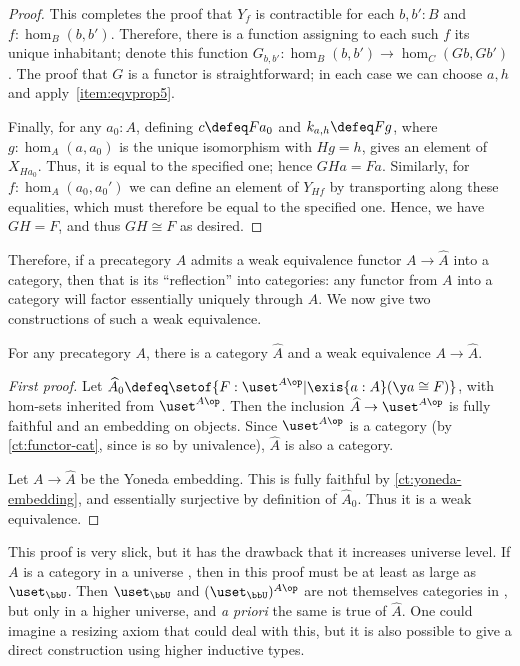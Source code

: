 \begin{proof}
  This completes the proof that $Y_f$ is contractible for each $b,b':B$ and $f:\hom_B(b,b')$.
  Therefore, there is a function assigning to each such $f$ its unique inhabitant; denote this function $G_{b,b'}:\hom_B(b,b') \to \hom_C(Gb,Gb')$.
  The proof that $G$ is a functor is straightforward; in each case we can choose $a,h$ and apply~\ref{item:eqvprop5}.

  Finally, for any $a_0:A$, defining $c\defeq Fa_0$ and $k_{a,h}\defeq F g$, where $g:\hom_A(a,a_0)$ is the unique isomorphism with $Hg = h$, gives an element of $X_{Ha_0}$.
  Thus, it is equal to the specified one; hence $GHa=Fa$.
  Similarly, for $f:\hom_A(a_0,a_0')$ we can define an element of $Y_{Hf}$ by transporting along these equalities, which must therefore be equal to the specified one.
  Hence, we have $GH=F$, and thus $GH\cong F$ as desired.
\end{proof}

%
Therefore, if a precategory $A$ admits a weak equivalence functor $A\to \widehat{A}$ into a category, then that is its ``reflection'' into categories: any functor from $A$ into a category will factor essentially uniquely through $\widehat{A}$.
We now give two constructions of such a weak equivalence.

%
%

\begin{thm}\label{thm:rezk-completion}
  For any precategory $A$, there is a category $\widehat A$ and a weak equivalence $A\to\widehat{A}$.
\end{thm}

\begin{proof}[First proof]
  Let $\widehat{A}_0 \defeq \setof{ F:\uset^{A\op} | \exis{a:A} (\y a \cong F)}$, with hom-sets inherited from $\uset^{A\op}$.
  Then the inclusion $\widehat{A} \to \uset^{A\op}$ is fully faithful and an embedding on objects.
  Since $\uset^{A\op}$ is a category (by \cref{ct:functor-cat}, since \uset is so by univalence), $\widehat A$ is also a category.

  Let $A\to\widehat A$ be the Yoneda embedding.
  This is fully faithful by \cref{ct:yoneda-embedding}, and essentially surjective by definition of $\widehat{A}_0$.
  Thus it is a weak equivalence.
\end{proof}

This proof is very slick, but it has the drawback that it increases universe level.
If $A$ is a category in a universe \bbU, then in this proof \uset must be at least as large as $\uset_\bbU$.
Then $\uset_\bbU$ and $(\uset_\bbU)^{A\op}$ are not themselves categories in \bbU, but only in a higher universe, and \emph{a priori} the same is true of $\widehat A$.
One could imagine a resizing axiom that could deal with this, but it is also possible to give a direct construction using higher inductive types.

